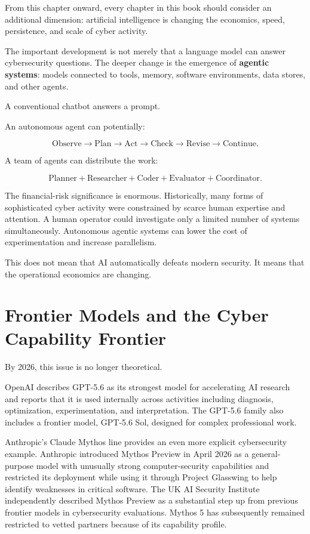 From this chapter onward, every chapter in this book should consider an additional dimension: artificial intelligence is changing the economics, speed, persistence, and scale of cyber activity.

The important development is not merely that a language model can answer cybersecurity questions. The deeper change is the emergence of \textbf{agentic systems}: models connected to tools, memory, software environments, data stores, and other agents.

A conventional chatbot answers a prompt.

An autonomous agent can potentially:

\begin{equation}
\text{Observe}
\rightarrow
\text{Plan}
\rightarrow
\text{Act}
\rightarrow
\text{Check}
\rightarrow
\text{Revise}
\rightarrow
\text{Continue}.
\end{equation}

A team of agents can distribute the work:

\begin{equation}
\text{Planner}
+
\text{Researcher}
+
\text{Coder}
+
\text{Evaluator}
+
\text{Coordinator}.
\end{equation}

The financial-risk significance is enormous. Historically, many forms of sophisticated cyber activity were constrained by scarce human expertise and attention. A human operator could investigate only a limited number of systems simultaneously. Autonomous agentic systems can lower the cost of experimentation and increase parallelism.

This does not mean that AI automatically defeats modern security. It means that the operational economics are changing.

\section{Frontier Models and the Cyber Capability Frontier}

By 2026, this issue is no longer theoretical.

OpenAI describes GPT-5.6 as its strongest model for accelerating AI research and reports that it is used internally across activities including diagnosis, optimization, experimentation, and interpretation. The GPT-5.6 family also includes a frontier model, GPT-5.6 Sol, designed for complex professional work.

Anthropic's Claude Mythos line provides an even more explicit cybersecurity example. Anthropic introduced Mythos Preview in April 2026 as a general-purpose model with unusually strong computer-security capabilities and restricted its deployment while using it through Project Glasswing to help identify weaknesses in critical software. The UK AI Security Institute independently described Mythos Preview as a substantial step up from previous frontier models in cybersecurity evaluations. Mythos 5 has subsequently remained restricted to vetted partners because of its capability profile.

